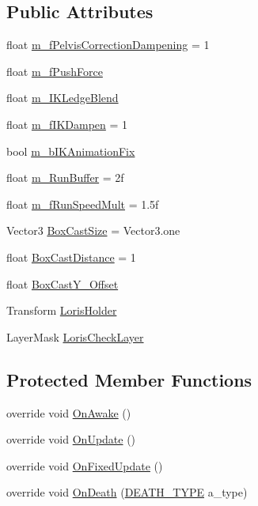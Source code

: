 \subsection*{Public Attributes}
\begin{DoxyCompactItemize}
\item 
float \mbox{\hyperlink{class_poodle_a66af4f17ace4a85c5280b7692a26fa0c}{m\+\_\+f\+Pelvis\+Correction\+Dampening}} = 1
\item 
float \mbox{\hyperlink{class_poodle_a134048ef3ba7ed3b67ca48822925c64c}{m\+\_\+f\+Push\+Force}}
\item 
float \mbox{\hyperlink{class_poodle_a09afc8011fdd8762fe83e4c56796d75a}{m\+\_\+\+I\+K\+Ledge\+Blend}}
\item 
float \mbox{\hyperlink{class_poodle_a4001bc9e52ae2ea7ae9e8af49baf1b48}{m\+\_\+f\+I\+K\+Dampen}} = 1
\item 
bool \mbox{\hyperlink{class_poodle_af814dd8bc3a241f977fcc3cd6f4e81d7}{m\+\_\+b\+I\+K\+Animation\+Fix}}
\item 
float \mbox{\hyperlink{class_poodle_a673508ffb04736432dbacf012f3ca0ef}{m\+\_\+\+Run\+Buffer}} = 2f
\item 
float \mbox{\hyperlink{class_poodle_acba2d379c3793b44fda2ea6b5dc45202}{m\+\_\+f\+Run\+Speed\+Mult}} = 1.\+5f
\item 
Vector3 \mbox{\hyperlink{class_poodle_ab04d1e89fcda03d28adc20257e7eb91d}{Box\+Cast\+Size}} = Vector3.\+one
\item 
float \mbox{\hyperlink{class_poodle_a8ce5f871336e0b20db5e56f59044cf2e}{Box\+Cast\+Distance}} = 1
\item 
float \mbox{\hyperlink{class_poodle_a8f3004f4bdff69af0fac2ee8bd0646cd}{Box\+Cast\+Y\+\_\+\+Offset}}
\item 
Transform \mbox{\hyperlink{class_poodle_a75a53eff0fa4c18603e09edf63ffbbf6}{Loris\+Holder}}
\item 
Layer\+Mask \mbox{\hyperlink{class_poodle_a3b1ec14dd7f47087bc37e16fadd568a4}{Loris\+Check\+Layer}}
\end{DoxyCompactItemize}
\subsection*{Protected Member Functions}
\begin{DoxyCompactItemize}
\item 
override void \mbox{\hyperlink{class_poodle_ac1de5bc05d00449271365b51f90ef80f}{On\+Awake}} ()
\item 
override void \mbox{\hyperlink{class_poodle_a48df28b8984d812658dae3516e9e421a}{On\+Update}} ()
\item 
override void \mbox{\hyperlink{class_poodle_a43c5147cedef40592b077814bffda480}{On\+Fixed\+Update}} ()
\item 
override void \mbox{\hyperlink{class_poodle_a86cc87a183e2b7b2297d9481c2c0d416}{On\+Death}} (\mbox{\hyperlink{_animal_8cs_aa09ea87b75a706096f010aef7b9b1826}{D\+E\+A\+T\+H\+\_\+\+T\+Y\+PE}} a\+\_\+type)
\end{DoxyCompactItemize}
